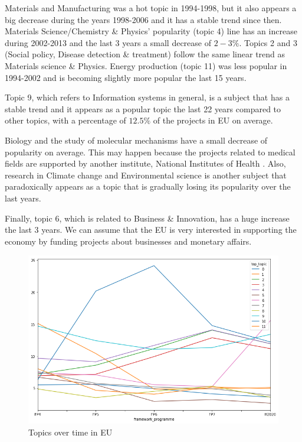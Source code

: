 \documentclass[12pt]{report}
\begin{document}
Materials and Manufacturing was a hot topic in 1994-1998, but it also
appears a big decrease during the years 1998-2006 and it has a stable
trend since then. Materials Science/Chemistry \& Physics' popularity
(topic 4) line has an increase during 2002-2013 and the last 3 years a
small decrease of $2-3\%$. Topics 2 and 3 (Social policy, Disease
detection \& treatment) follow the same linear trend as Materials
science \& Physics. Energy production (topic 11) was less popular in
1994-2002 and is becoming slightly more popular the last 15
years.

Topic 9, which refers to Information systems in general, is a subject that has a
stable trend and it appears as a popular topic the last 22 years compared to
other topics, with a percentage of $12.5\%$ of the projects in EU on average.

Biology and the study of molecular mechanisms have a small decrease of
popularity on average. This may happen because the projects related to
medical fields are supported by another institute, National Institutes
of Health . Also,
research in Climate change and Environmental science is another
subject that paradoxically appears as a topic that is gradually losing
its popularity over the last years.

Finally, topic 6, which is related to Business \& Innovation, has a huge
increase the last 3 years. We can assume that the EU is very interested in
supporting the economy by funding projects about businesses and monetary
affairs.
\begin{center}
\begin{figure}
\includegraphics[width=1.0\textwidth]
{figs/eu-topic-evolution.png}
\caption{Topics over time in EU}
\label{eutrend}
\end{figure}
\end{center}
\end{document}

